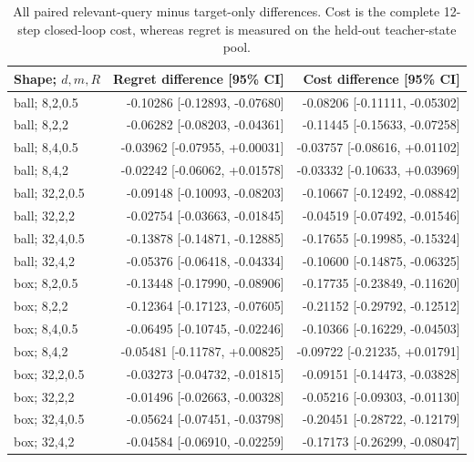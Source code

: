 \begin{table}[htbp]\centering\scriptsize
\caption{All paired relevant-query minus target-only differences. Cost is the complete 12-step closed-loop cost, whereas regret is measured on the held-out teacher-state pool.}\label{tab:minimal-differences}
\begin{tabular}{lrr}\toprule
Shape; $d,m,R$ & Regret difference [95\% CI] & Cost difference [95\% CI]\\\midrule
ball; 8,2,0.5 & -0.10286 [-0.12893, -0.07680] & -0.08206 [-0.11111, -0.05302]\\
ball; 8,2,2 & -0.06282 [-0.08203, -0.04361] & -0.11445 [-0.15633, -0.07258]\\
ball; 8,4,0.5 & -0.03962 [-0.07955, +0.00031] & -0.03757 [-0.08616, +0.01102]\\
ball; 8,4,2 & -0.02242 [-0.06062, +0.01578] & -0.03332 [-0.10633, +0.03969]\\
ball; 32,2,0.5 & -0.09148 [-0.10093, -0.08203] & -0.10667 [-0.12492, -0.08842]\\
ball; 32,2,2 & -0.02754 [-0.03663, -0.01845] & -0.04519 [-0.07492, -0.01546]\\
ball; 32,4,0.5 & -0.13878 [-0.14871, -0.12885] & -0.17655 [-0.19985, -0.15324]\\
ball; 32,4,2 & -0.05376 [-0.06418, -0.04334] & -0.10600 [-0.14875, -0.06325]\\
box; 8,2,0.5 & -0.13448 [-0.17990, -0.08906] & -0.17735 [-0.23849, -0.11620]\\
box; 8,2,2 & -0.12364 [-0.17123, -0.07605] & -0.21152 [-0.29792, -0.12512]\\
box; 8,4,0.5 & -0.06495 [-0.10745, -0.02246] & -0.10366 [-0.16229, -0.04503]\\
box; 8,4,2 & -0.05481 [-0.11787, +0.00825] & -0.09722 [-0.21235, +0.01791]\\
box; 32,2,0.5 & -0.03273 [-0.04732, -0.01815] & -0.09151 [-0.14473, -0.03828]\\
box; 32,2,2 & -0.01496 [-0.02663, -0.00328] & -0.05216 [-0.09303, -0.01130]\\
box; 32,4,0.5 & -0.05624 [-0.07451, -0.03798] & -0.20451 [-0.28722, -0.12179]\\
box; 32,4,2 & -0.04584 [-0.06910, -0.02259] & -0.17173 [-0.26299, -0.08047]\\
\bottomrule\end{tabular}\end{table}
